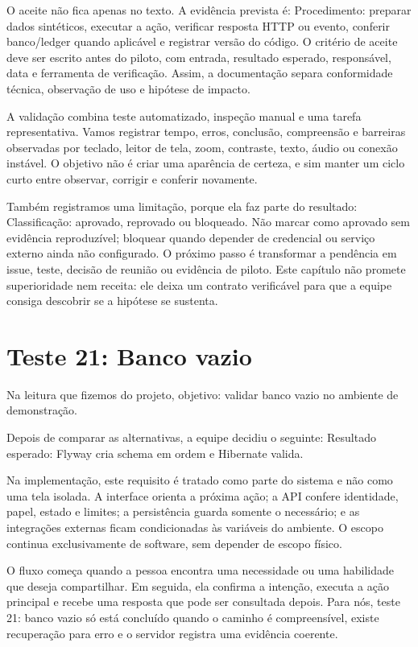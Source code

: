 \documentclass[12pt,oneside,a4paper,article]{abntex2}
\begin{document}
O aceite não fica apenas no texto. A evidência prevista é: Procedimento: preparar dados sintéticos, executar a ação, verificar resposta HTTP ou evento, conferir banco/ledger quando aplicável e registrar versão do código. O critério de aceite deve ser escrito antes do piloto, com entrada, resultado esperado, responsável, data e ferramenta de verificação. Assim, a documentação separa conformidade técnica, observação de uso e hipótese de impacto.

A validação combina teste automatizado, inspeção manual e uma tarefa representativa. Vamos registrar tempo, erros, conclusão, compreensão e barreiras observadas por teclado, leitor de tela, zoom, contraste, texto, áudio ou conexão instável. O objetivo não é criar uma aparência de certeza, e sim manter um ciclo curto entre observar, corrigir e conferir novamente.

Também registramos uma limitação, porque ela faz parte do resultado: Classificação: aprovado, reprovado ou bloqueado. Não marcar como aprovado sem evidência reproduzível; bloquear quando depender de credencial ou serviço externo ainda não configurado. O próximo passo é transformar a pendência em issue, teste, decisão de reunião ou evidência de piloto. Este capítulo não promete superioridade nem receita: ele deixa um contrato verificável para que a equipe consiga descobrir se a hipótese se sustenta.

\section{Teste 21: Banco vazio}
Na leitura que fizemos do projeto, objetivo: validar banco vazio no ambiente de demonstração.

Depois de comparar as alternativas, a equipe decidiu o seguinte: Resultado esperado: Flyway cria schema em ordem e Hibernate valida.

Na implementação, este requisito é tratado como parte do sistema e não como uma tela isolada. A interface orienta a próxima ação; a API confere identidade, papel, estado e limites; a persistência guarda somente o necessário; e as integrações externas ficam condicionadas às variáveis do ambiente. O escopo continua exclusivamente de software, sem depender de escopo físico.

O fluxo começa quando a pessoa encontra uma necessidade ou uma habilidade que deseja compartilhar. Em seguida, ela confirma a intenção, executa a ação principal e recebe uma resposta que pode ser consultada depois. Para nós, teste 21: banco vazio só está concluído quando o caminho é compreensível, existe recuperação para erro e o servidor registra uma evidência coerente.
\end{document}
